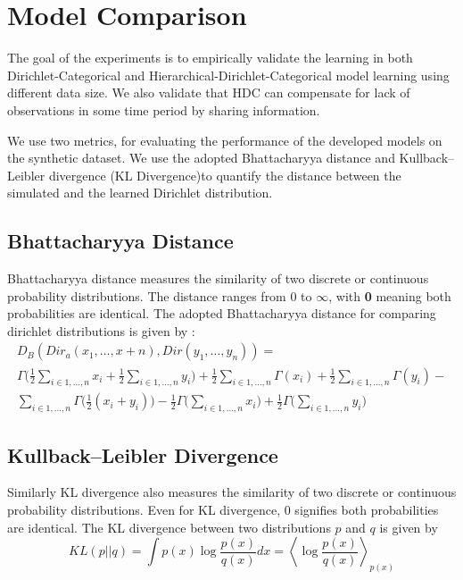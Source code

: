 \section{Model Comparison}

The goal of the experiments is to empirically validate the learning in both Dirichlet-Categorical and Hierarchical-Dirichlet-Categorical model 
learning using different data size. We also validate that HDC can compensate  for lack of observations in some time period by sharing information.

We use two metrics, for evaluating the performance of the developed models on the synthetic dataset. We use the adopted Bhattacharyya distance \cite{bhattacharyya1946measure} and Kullback–Leibler divergence \cite{kullback1951information}  (KL Divergence)to quantify the distance between the simulated and the learned Dirichlet distribution.   

\subsection{Bhattacharyya Distance}
Bhattacharyya distance measures the similarity of two discrete or continuous probability distributions. The distance ranges from 0 to $\infty$, with \textbf{0} meaning both probabilities are identical. The  adopted Bhattacharyya distance \cite{rauber2008bhattacharyya} for comparing dirichlet distributions is given by :
\begin{multline}
	D_B (Dir_a (x_1, \dots ,x+n), Dir (y_1, \dots , y_n)) = \nonumber\\
	 \Gamma \Bigg ( \frac{1}{2}  \sum_{i \in {1, \dots, n}} x_i +  \frac{1}{2}\sum_{i \in {1, \dots, n}} y_i\Bigg) + 
	\frac{1}{2}  \sum_{i \in {1, \dots, n}} \Gamma  (x_i) + 
	\frac{1}{2}  \sum_{i \in {1, \dots, n}} \Gamma  (y_i) - \\ 
	\sum_{i \in {1, \dots, n}} \Gamma \bigg (\frac{1}{2}  (x_i + y_i) \bigg) - \frac{1}{2}  \Gamma \Bigg (  \sum_{i \in {1, \dots, n}} x_i \Bigg) + \frac{1}{2}  \Gamma \Bigg ( \sum_{i \in {1, \dots, n}} y_i\Bigg)
\end{multline}

\subsection{Kullback–Leibler Divergence}
Similarly KL divergence also measures the similarity of two discrete or continuous probability distributions. Even for KL divergence, 0 signifies both probabilities are identical.  
The KL divergence between two distributions $p$ and $q$ is given by
\begin{equation*}
	KL (p||q) = \int p (x) \log \frac{p (x)}{q (x)} dx = \left < \log \frac{p (x)}{q (x)}  \right>_{p (x)}
\end{equation*}

